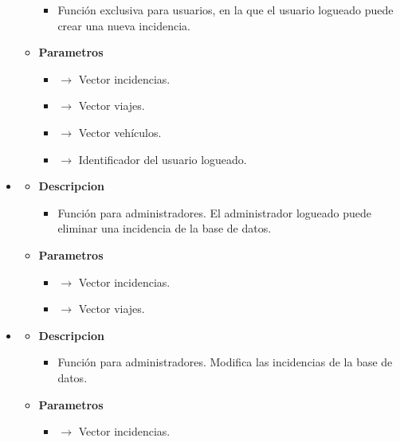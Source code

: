 \begin{itemize}
\begin{itemize}
        \begin{itemize}
			\item Función exclusiva para usuarios, en la que el usuario logueado puede crear una nueva incidencia.
		\end{itemize}
        \item \textbf{Parametros}
		\begin{itemize}
            \item {} $\rightarrow$ Vector incidencias.
            \item {} $\rightarrow$ Vector viajes.
            \item {} $\rightarrow$ Vector vehículos.
            \item {} $\rightarrow$ Identificador del usuario logueado.
		\end{itemize}
	\end{itemize}
    \item{}
	\begin{itemize}
		\item \textbf{Descripcion}
        \begin{itemize}
			\item Función para administradores. El administrador logueado puede eliminar una incidencia de la base de datos.
		\end{itemize}
        \item \textbf{Parametros}
		\begin{itemize}
			\item {} $\rightarrow$ Vector incidencias.
            \item {} $\rightarrow$ Vector viajes.
		\end{itemize}
	\end{itemize}
    \newpage
    \item{}
	\begin{itemize}
		\item \textbf{Descripcion}
        \begin{itemize}
			\item Función para administradores. Modifica las incidencias de la base de datos.
		\end{itemize}
        \item \textbf{Parametros}
		\begin{itemize}
			\item {} $\rightarrow$ Vector incidencias.
		\end{itemize}
	\end{itemize}
\end{itemize}
\newpage
